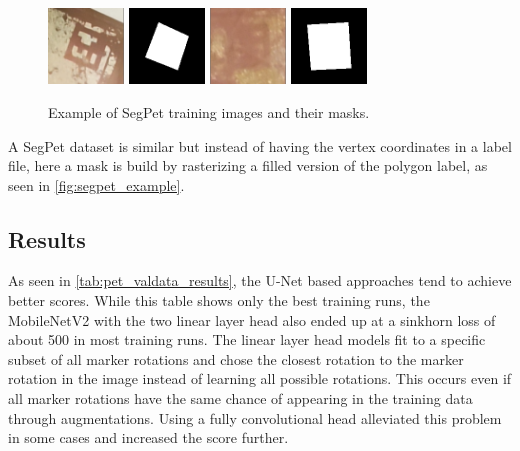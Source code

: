 \documentclass[10pt]{book}
\newcommand{\figureref}[1]{\autoref{#1}}
\begin{document}
\begin{figure}
  \centering
     {\includegraphics[width=0.18\textwidth]{image/segpet_example_in}}
     {\includegraphics[width=0.18\textwidth]{image/segpet_example_seg}}
     {\includegraphics[width=0.18\textwidth]{image/segpet_example_2_in}}
     {\includegraphics[width=0.18\textwidth]{image/segpet_example_2_seg}}
  \caption{Example of SegPet training images and their masks.}
  \label{fig:segpet_example}
\end{figure}

A SegPet dataset is similar but instead of having the vertex coordinates in a label file, here a mask is build by rasterizing a filled version of the polygon label, as seen in \figureref{fig:segpet_example}.

\subsection{Results}

As seen in \autoref{tab:pet_valdata_results}, the U-Net based approaches tend to achieve better scores. While this table shows only the best training runs, the MobileNetV2 with the two linear layer head also ended up at a sinkhorn loss of about 500 in most training runs. %
The linear layer head models fit to a specific subset of all marker rotations and chose the closest rotation to the marker rotation in the image instead of learning all possible rotations. This occurs even if all marker rotations have the same chance of appearing in the training data through augmentations. Using a fully convolutional head alleviated this problem in some cases and increased the score further.
\end{document}
